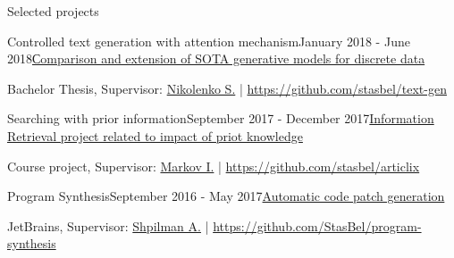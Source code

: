 \documentclass{resume} %
\begin{document}

\vspace{-0.9\baselineskip}
\begin{rSection}{Selected projects}

\begin{rSubsection}{Controlled text generation with attention mechanism}{January 2018 - June 2018}{\href{https://github.com/stasbel/bachelor-thesis}{Сomparison and extension of SOTA generative models for discrete data}}{}
\item[] Bachelor Thesis, Supervisor: \href{https://logic.pdmi.ras.ru/~sergey/}{Nikolenko S.} | \url{https://github.com/stasbel/text-gen}
\end{rSubsection}

\vspace{-0.9\baselineskip}
\begin{rSubsection}{Searching with prior information}{September 2017 - December 2017}{\href{https://github.com/stasbel/articlix/blob/master/misc/articlix-final-report.pdf}{Information Retrieval project related to impact of priot knowledge}}{}
\item[] Course project, Supervisor: \href{https://staff.fnwi.uva.nl/i.markov/}{Markov I.} | \url{https://github.com/stasbel/articlix}
\end{rSubsection}

\vspace{-0.9\baselineskip}
\begin{rSubsection}{Program Synthesis}{September 2016 - May 2017}{\href{https://docs.google.com/presentation/d/113EFcW8L7p8ickhfMoht8ivOomq2fRPizLtWSH9cSX4/pub?start=false&loop=false&delayms=3000}{Automatic code patch generation}}{}
\item[] JetBrains, Supervisor: \href{https://research.jetbrains.org/ru/researchers/ashpilman}{Shpilman A.} | \url{https://github.com/StasBel/program-synthesis}
\end{rSubsection}

\end{rSection}
\end{document}
